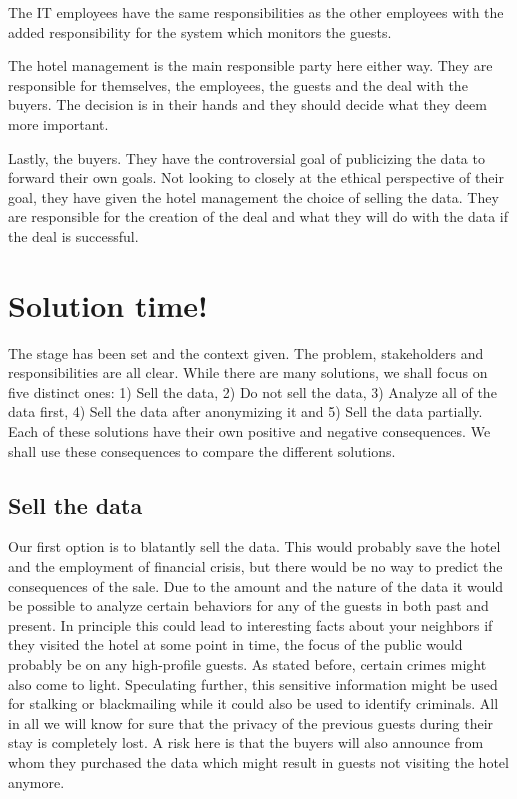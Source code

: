 The IT employees have the same responsibilities as the other employees with the added responsibility for the system which monitors the guests.

The hotel management is the main responsible party here either way. They are responsible for themselves, the employees, the guests and the deal with the buyers. The decision is in their hands and they should decide what they deem more important.

Lastly, the buyers. They have the controversial goal of publicizing the data to forward their own goals. Not looking to closely at the ethical perspective of their goal, they have given the hotel management the choice of selling the data. They are responsible for the creation of the deal and what they will do with the data if the deal is successful.
  
\section{Solution time!}
The stage has been set and the context given. The problem, stakeholders and responsibilities are all clear. While there are many solutions, we shall focus on five distinct ones: 1) Sell the data, 2) Do not sell the data, 3) Analyze all of the data first, 4) Sell the data after anonymizing it and 5) Sell the data partially. Each of these solutions have their own positive and negative consequences. We shall use these consequences to compare the different solutions.  

\subsection{Sell the data}
Our first option is to blatantly sell the data. This would probably save the hotel and the employment of financial crisis, but there would be no way to predict the consequences of the sale. Due to the amount and the nature of the data it would be possible to analyze certain behaviors for any of the guests in both past and present. In principle this could lead to interesting facts about your neighbors if they visited the hotel at some point in time, the focus of the public would probably be on any high-profile guests. As stated before, certain crimes might also come to light. Speculating further, this sensitive information might be used for stalking or blackmailing while it could also be used to identify criminals. All in all we will know for sure that the privacy of the previous guests during their stay is completely lost. A risk here is that the buyers will also announce from whom they purchased the data which might result in guests not visiting the hotel anymore.

